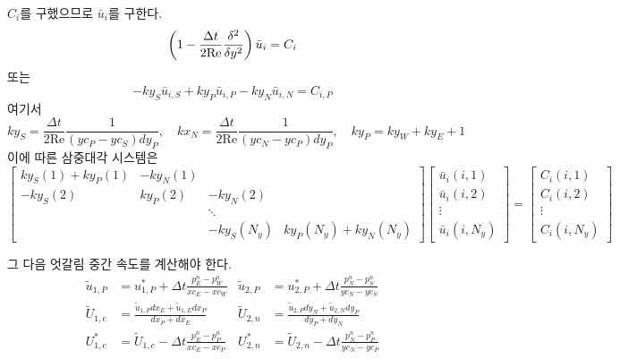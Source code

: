 \documentclass[a4paper, 10pt]{article}
\renewcommand{\Re}{\mathrm{Re}}
\begin{document}
$C_i$를 구했으므로 $\bar{u}_i$를 구한다.
\begin{equation}
    \left( 1 - \frac{\Delta t}{2\Re} \frac{\delta^2}{\delta y^2} \right) \bar{u}_i = C_i \\
\end{equation}
또는
\begin{equation}
    -ky_S \bar{u}_{i, S} + ky_P \bar{u}_{i, P} - ky_N \bar{u}_{i, N} = C_{i, P}
\end{equation}
여기서
\begin{equation}
    ky_S = \frac{\Delta t}{2\Re} \frac{1}{(yc_P-yc_S)dy_P}, \quad kx_N = \frac{\Delta t}{2\Re} \frac{1}{(yc_N-yc_P)dy_P}, \quad ky_P = ky_W + ky_E + 1
\end{equation}
이에 따른 삼중대각 시스템은
\begin{equation}
    \begin{bmatrix}
        ky_S(1) + ky_P(1) & -ky_N(1) & & \\
        -ky_S(2) & ky_P(2) & -ky_N(2) & \\
        & & \ddots & \\
        & & -ky_S(N_y) & ky_P(N_y) + ky_N(N_y)
    \end{bmatrix}
    \begin{bmatrix}
        \bar{u}_i(i, 1) \\
        \bar{u}_i(i, 2) \\
        \vdots \\
        \bar{u}_i(i, N_y)
    \end{bmatrix}
    =
    \begin{bmatrix}
        C_i(i, 1) \\
        C_i(i, 2) \\
        \vdots \\
        C_i(i, N_y)
    \end{bmatrix}
\end{equation}

그 다음 엇갈림 중간 속도를 계산해야 한다.
\begin{subequations}
    \begin{align}
        \widetilde{u}_{1, P} &= u_{1, P}^* + \Delta t \frac{p_E^n - p_W^n}{xc_E - xc_W} &
        \widetilde{u}_{2, P} &= u_{2, P}^* + \Delta t \frac{p_N^n - p_S^n}{yc_N - yc_S} \\
        \widetilde{U}_{1, e} &= \frac{\widetilde{u}_{1, P} dx_E + \widetilde{u}_{1, E} dx_P}{dx_P + dx_E} &
        \widetilde{U}_{2, n} &= \frac{\widetilde{u}_{2, P} dy_N + \widetilde{u}_{2, N} dy_P}{dy_P + dy_N} \\
        U_{1, e}^* &= \widetilde{U}_{1, e} - \Delta t \frac{p_E^n - p_P^n}{xc_E - xc_P} &
        U_{2, n}^* &= \widetilde{U}_{2, n} - \Delta t \frac{p_N^n - p_P^n}{yc_N - yc_P}
    \end{align}
\end{subequations}
\end{document}
